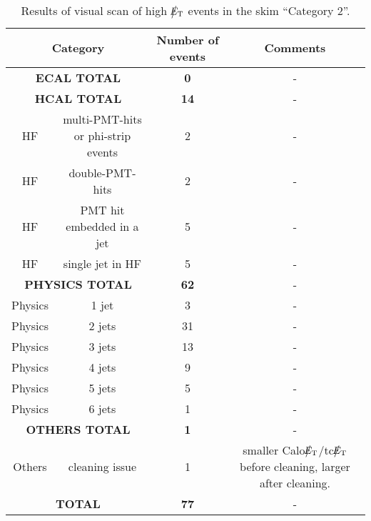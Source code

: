 \begin{table}[h]
  \begin{center}
    \begin{tabular}{|c|c|c|c|}
      \hline
      \multicolumn{2}{|c|}{Category} & Number of events  & Comments   \\ 
      \hline\hline
      \multicolumn{2}{|c|}{\bf ECAL TOTAL} & \bf{0}      & - \\
      \hline    
      \multicolumn{2}{|c|}{\bf HCAL TOTAL} & \bf{14}      & - \\
      \hline
      HF & multi-PMT-hits or phi-strip events & 2 & - \\           
      HF & double-PMT-hits & 2 & - \\           
      HF & PMT hit embedded in a jet & 5 & - \\           
      HF & single jet in HF & 5 & - \\           
      \hline    
      \multicolumn{2}{|c|}{\bf PHYSICS TOTAL} & \bf{62}      & - \\
      \hline
      Physics & 1 jet & 3 & - \\
      Physics & 2 jets & 31 & - \\
      Physics & 3 jets & 13 & - \\
      Physics & 4 jets & 9 & - \\
      Physics & 5 jets & 5 & - \\
      Physics & 6 jets & 1 & - \\
      \hline
      \multicolumn{2}{|c|}{\bf OTHERS TOTAL} & \bf{1}      & - \\
      \hline          
      Others & cleaning issue & 1 & smaller Calo$\big\slash\hspace{-1.6ex}{E_\text{T}}$/tc$\big\slash\hspace{-1.6ex}{E_\text{T}}$ before cleaning, larger after cleaning. \\
      \hline          
      \multicolumn{2}{|c|}{\bf TOTAL} & \bf{77}      & - \\
      \hline
    \end{tabular}
    \caption{Results of visual scan of high $\big\slash\hspace{-1.6ex}{E_\text{T}}$ events in the skim ``Category 2''.}
    \label{tab:Category2}
  \end{center}
\end{table}


